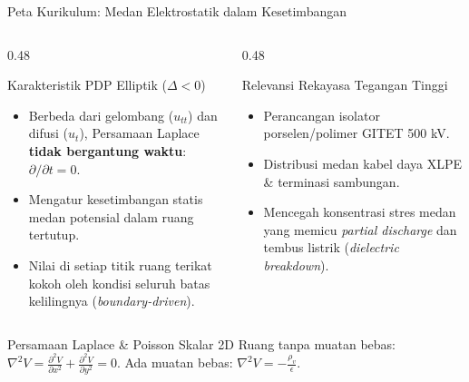 \documentclass[aspectratio=169,10pt]{beamer}
\begin{document}
\begin{frame}{Peta Kurikulum: Medan Elektrostatik dalam Kesetimbangan}
  \begin{columns}[t]
    \begin{column}{0.48\textwidth}
      \begin{block}{Karakteristik PDP Elliptik ($\Delta < 0$)}
        \small
        \begin{itemize}
          \item Berbeda dari gelombang ($u_{tt}$) dan difusi ($u_t$), Persamaan Laplace \textbf{tidak bergantung waktu}: $\partial/\partial t = 0$.
          \item Mengatur kesetimbangan statis medan potensial dalam ruang tertutup.
          \item Nilai di setiap titik ruang terikat kokoh oleh kondisi seluruh batas kelilingnya (\textit{boundary-driven}).
        \end{itemize}
      \end{block}
    \end{column}
    \begin{column}{0.48\textwidth}
      \begin{alertblock}{Relevansi Rekayasa Tegangan Tinggi}
        \small
        \begin{itemize}
          \item Perancangan isolator porselen/polimer GITET 500 kV.
          \item Distribusi medan kabel daya XLPE \& terminasi sambungan.
          \item Mencegah konsentrasi stres medan yang memicu \textit{partial discharge} dan tembus listrik (\textit{dielectric breakdown}).
        \end{itemize}
      \end{alertblock}
    \end{column}
  \end{columns}
  \vspace{0.05cm}
  \begin{exampleblock}{Persamaan Laplace \& Poisson Skalar 2D}
    \small
    Ruang tanpa muatan bebas: $\nabla^2 V = \frac{\partial^2 V}{\partial x^2} + \frac{\partial^2 V}{\partial y^2} = 0$. \quad Ada muatan bebas: $\nabla^2 V = -\frac{\rho_v}{\epsilon}$.
  \end{exampleblock}
\end{frame}
\end{document}

